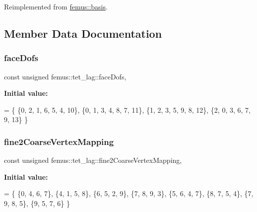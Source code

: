 Reimplemented from \mbox{\hyperlink{classfemus_1_1basis_abbb9deb1bd0b2d07a4b2995b07d58d2e}{femus\+::basis}}.



\subsection{Member Data Documentation}
\mbox{\label{classfemus_1_1tet__lag_a628e1f77119ab2590a29791c9d34ce41}} 
\subsubsection{\texorpdfstring{face\+Dofs}{faceDofs}}
{\footnotesize\ttfamily const unsigned femus\+::tet\+\_\+lag\+::face\+Dofs\hspace{0.3cm}{\ttfamily [static]}, {\ttfamily [protected]}}

{\bfseries Initial value\+:}
\begin{DoxyCode}
= \{
    \{0, 2, 1, 6, 5, 4, 10\},
    \{0, 1, 3, 4, 8, 7, 11\},
    \{1, 2, 3, 5, 9, 8, 12\},
    \{2, 0, 3, 6, 7, 9, 13\}
  \}
\end{DoxyCode}
\mbox{\label{classfemus_1_1tet__lag_a688104062d37e02e94a2d398be0fc8ee}} 
\subsubsection{\texorpdfstring{fine2\+Coarse\+Vertex\+Mapping}{fine2CoarseVertexMapping}}
{\footnotesize\ttfamily const unsigned femus\+::tet\+\_\+lag\+::fine2\+Coarse\+Vertex\+Mapping\hspace{0.3cm}{\ttfamily [static]}, {\ttfamily [protected]}}

{\bfseries Initial value\+:}
\begin{DoxyCode}
= \{ 
    \{0, 4, 6, 7\},
    \{4, 1, 5, 8\},
    \{6, 5, 2, 9\},
    \{7, 8, 9, 3\},  
    \{5, 6, 4, 7\}, 
    \{8, 7, 5, 4\}, 
    \{7, 9, 8, 5\}, 
    \{9, 5, 7, 6\}  
  \}
\end{DoxyCode}
\mbox{\label{classfemus_1_1tet__lag_a842f4e18f25e31cfb86aaa50189415ef}} 
